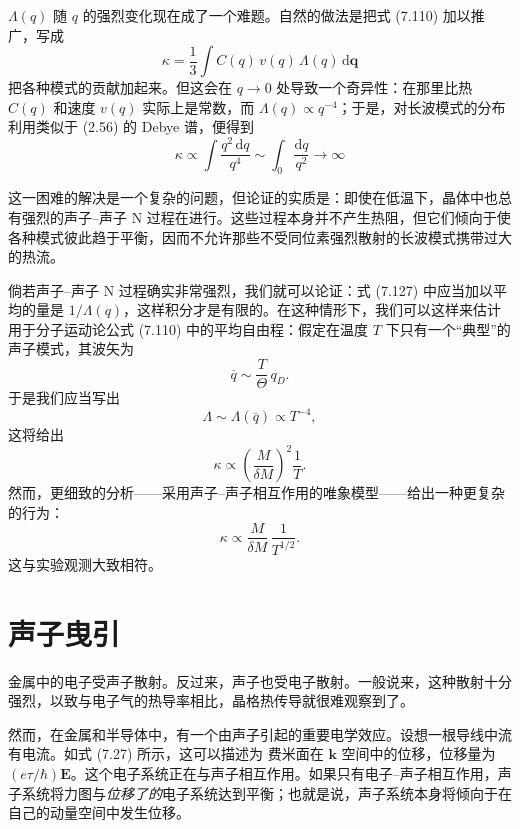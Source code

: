 $\Lambda(q)$ 随 $q$ 的强烈变化现在成了一个难题。自然的做法是把式 (7.110) 加以推广，写成
\begin{equation*}
\kappa=\frac{1}{3}\int C(q)\,v(q)\,\Lambda(q)\,\mathrm{d}\mathbf{q}\tag{7.127}
\end{equation*}
把各种模式的贡献加起来。但这会在 $q\to 0$ 处导致一个奇异性：在那里比热 $C(q)$ 和速度 $v(q)$ 实际上是常数，而 $\Lambda(q)\propto q^{-4}$；于是，对长波模式的分布利用类似于 (2.56) 的 Debye 谱，便得到
\begin{equation*}
\kappa\propto\int\frac{q^{2}\,\mathrm{d}q}{q^{4}}\sim\int_{0}\frac{\mathrm{d}q}{q^{2}}\to\infty\tag{7.128}
\end{equation*}

这一困难的解决是一个复杂的问题，但论证的实质是：即使在低温下，晶体中也总有强烈的声子--声子 N 过程在进行。这些过程本身并不产生热阻，但它们倾向于使各种模式彼此趋于平衡，因而不允许那些不受同位素强烈散射的长波模式携带过大的热流。

倘若声子--声子 N 过程确实非常强烈，我们就可以论证：式 (7.127) 中应当加以平均的量是 $1/\Lambda(q)$，这样积分才是有限的。在这种情形下，我们可以这样来估计用于分子运动论公式 (7.110) 中的平均自由程：假定在温度 $T$ 下只有一个“典型”的声子模式，其波矢为
\begin{equation*}
\overline{q}\sim\frac{T}{\Theta}\,q_{D}.\tag{7.129}
\end{equation*}
于是我们应当写出
\begin{equation*}
\Lambda\sim\Lambda(\overline{q})\propto T^{-4},\tag{7.130}
\end{equation*}
这将给出
\begin{equation*}
\kappa\propto\left(\frac{M}{\delta M}\right)^{2}\frac{1}{T}.\tag{7.131}
\end{equation*}
然而，更细致的分析——采用声子--声子相互作用的唯象模型——给出一种更复杂的行为：
\begin{equation*}
\kappa\propto\frac{M}{\delta M}\,\frac{1}{T^{1/2}}.\tag{7.132}
\end{equation*}
这与实验观测大致相符。

\section{声子曳引}

金属中的电子受声子散射。反过来，声子也受电子散射。一般说来，这种散射十分强烈，以致与电子气的热导率相比，晶格热传导就很难观察到了。

然而，在金属和半导体中，有一个由声子引起的重要电学效应。设想一根导线中流有电流。如式 (7.27) 所示，这可以描述为 费米面在 $\mathbf{k}$ 空间中的位移，位移量为 $(e\tau/\hbar)\mathbf{E}$。这个电子系统正在与声子相互作用。如果只有电子--声子相互作用，声子系统将力图与\emph{位移了的}电子系统达到平衡；也就是说，声子系统本身将倾向于在自己的动量空间中发生位移。

